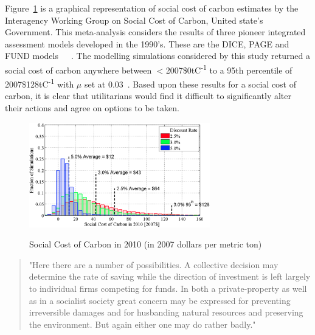 \documentclass[11pt, oneside]{article}   	%
\begin{document}
Figure~\ref{USA SCC figure} is a graphical representation of social cost of carbon estimates by the Interagency Working Group on Social Cost of Carbon, United state's Government. This meta-analysis considers the results of three pioneer integrated assessment models developed in the 1990's. These are the DICE, PAGE and FUND models~\cite{wn1}~\cite{ch1}~\cite{rsjt1}. The modelling simulations considered by this study returned a social cost of carbon anywhere between $<$2007\$0tC\textsuperscript{-1} to a 95th percentile of 2007\$128tC\textsuperscript{-1} with $\mu$ set at 0.03~\cite{iwg1}. Based upon these results for a social cost of carbon, it is clear that utilitarians would find it difficult to significantly alter their actions and agree on options to be taken. 

\begin{figure}[h]
\caption{Social Cost of Carbon in 2010 (in 2007 dollars per metric ton)}
\centering
\includegraphics[width=0.7\textwidth]{scc}
\label{USA SCC figure}
\end{figure}

\begin{quote}
"Here there are a number of possibilities. A collective decision may determine the rate of saving while the direction of investment is left largely to individual firms competing for funds. In both a private-property as well as in a socialist society great concern may be expressed for preventing irreversible damages and for husbanding natural resources and preserving the environment. But again either one may do rather badly."~\cite{jr1}
\end{quote}
\end{document}
